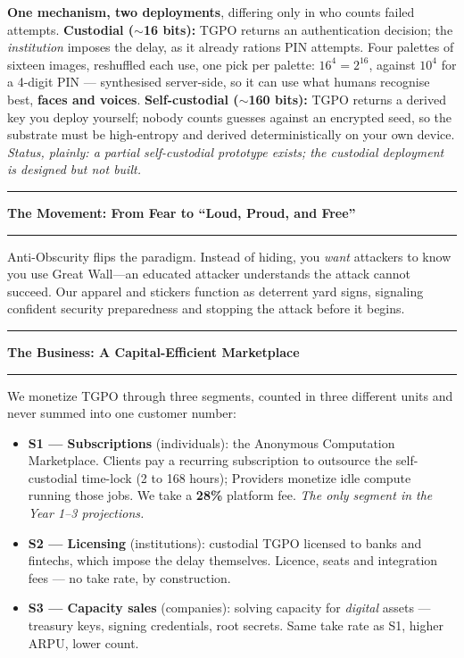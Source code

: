 \documentclass[8pt]{article}
\begin{document}
\vspace{0.15cm}

\noindent\textbf{One mechanism, two deployments}, differing only in who counts failed attempts. \textbf{Custodial ($\sim$16 bits):} TGPO returns an authentication decision; the \emph{institution} imposes the delay, as it already rations PIN attempts. Four palettes of sixteen images, reshuffled each use, one pick per palette: $16^4 = 2^{16}$, against $10^4$ for a 4-digit PIN --- synthesised server-side, so it can use what humans recognise best, \textbf{faces and voices}. \textbf{Self-custodial ($\sim$160 bits):} TGPO returns a derived key you deploy yourself; nobody counts guesses against an encrypted seed, so the substrate must be high-entropy and derived deterministically on your own device. \emph{Status, plainly: a partial self-custodial prototype exists; the custodial deployment is designed but not built.}

\vspace{0.28cm}

{\color{accent}\hrule}
\vspace{0.2cm}
{\Large\textbf{The Movement: From Fear to ``Loud, Proud, and Free''}}
\vspace{0.2cm}
{\color{accent}\hrule}
\vspace{0.22cm}

\noindent Anti-Obscurity flips the paradigm. Instead of hiding, you \emph{want} attackers to know you use Great Wall—an educated attacker understands the attack cannot succeed. Our apparel and stickers function as deterrent yard signs, signaling confident security preparedness and stopping the attack before it begins.

\vspace{0.28cm}

{\color{accent}\hrule}
\vspace{0.2cm}
{\Large\textbf{The Business: A Capital-Efficient Marketplace}}
\vspace{0.2cm}
{\color{accent}\hrule}
\vspace{0.22cm}

\noindent We monetize TGPO through three segments, counted in three different units and never summed into one customer number:
\begin{itemize}\itemsep0pt
  \item \textbf{S1 --- Subscriptions} (individuals): the Anonymous Computation Marketplace. Clients pay a recurring subscription to outsource the self-custodial time-lock (2 to 168 hours); Providers monetize idle compute running those jobs. We take a \textbf{28\%} platform fee. \emph{The only segment in the Year 1--3 projections.}
  \item \textbf{S2 --- Licensing} (institutions): custodial TGPO licensed to banks and fintechs, which impose the delay themselves. Licence, seats and integration fees --- no take rate, by construction.
  \item \textbf{S3 --- Capacity sales} (companies): solving capacity for \emph{digital} assets --- treasury keys, signing credentials, root secrets. Same take rate as S1, higher ARPU, lower count.
\end{itemize}
\end{document}

